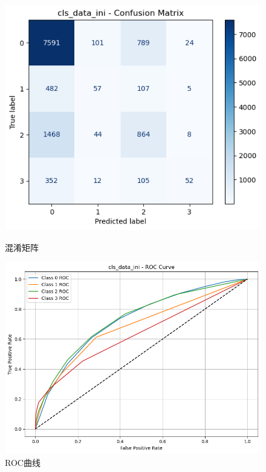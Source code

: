 \documentclass[10pt]{article}
\begin{document}
\begin{figure}[H]
\centering
\begin{minipage}[t]{0.45\textwidth}
  \centering
  \includegraphics[width=\linewidth]{cls_knn_ini1.png}
  \caption{混淆矩阵}
  \label{fig:20}
\end{minipage}
\hfill
\begin{minipage}[t]{0.52\textwidth}
  \centering
  \includegraphics[width=\linewidth]{cls_knn_ini2.png}
  \caption{ROC曲线}
  \label{fig:21}
\end{minipage}
\end{figure}
\end{document}
